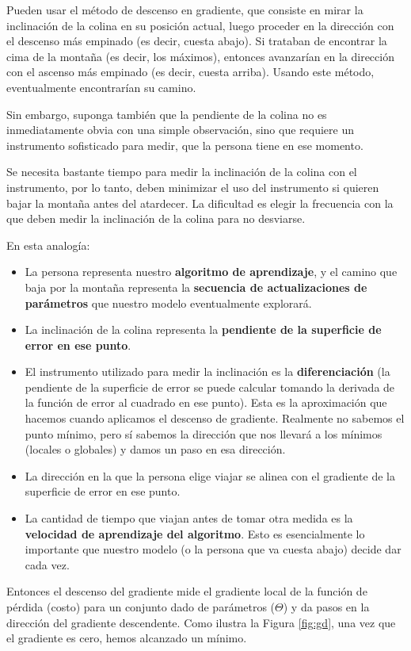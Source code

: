\documentclass[a4paper,12pt]{article}
\begin{document}
Pueden usar el método de descenso en gradiente, que consiste en mirar la inclinación de la colina en su posición actual, luego proceder en la dirección con el descenso más empinado (es decir, cuesta abajo).
Si trataban de encontrar la cima de la montaña (es decir, los máximos), entonces avanzarían en la dirección con el ascenso más empinado (es decir, cuesta arriba). Usando este método, eventualmente encontrarían su camino.

Sin embargo, suponga también que la pendiente de la colina no es inmediatamente obvia con una simple observación, sino que requiere un instrumento sofisticado para medir, que la persona tiene en ese momento.

Se necesita bastante tiempo para medir la inclinación de la colina con el instrumento, por lo tanto, deben minimizar el uso del instrumento si quieren bajar la montaña antes del atardecer.
La dificultad es elegir la frecuencia con la que deben medir la inclinación de la colina para no desviarse.

En esta analogía:
\begin{itemize}[noitemsep, topsep=2pt]
	\item La persona representa nuestro \textbf{algoritmo de aprendizaje}, y el camino que baja por la montaña representa la \textbf{secuencia de actualizaciones de parámetros} que nuestro modelo eventualmente explorará.
	\item La inclinación de la colina representa la \textbf{pendiente de la superficie de error en ese punto}.
	\item El instrumento utilizado para medir la inclinación es la \textbf{diferenciación} (la pendiente de la superficie de error se puede calcular tomando la derivada de la función de error al cuadrado en ese punto). Esta es la aproximación que hacemos cuando aplicamos el descenso de gradiente. Realmente no sabemos el punto mínimo, pero sí sabemos la dirección que nos llevará a los mínimos (locales o globales) y damos un paso en esa dirección.
	\item La dirección en la que la persona elige viajar se alinea con el gradiente de la superficie de error en ese punto.
	\item La cantidad de tiempo que viajan antes de tomar otra medida es la \textbf{velocidad de aprendizaje del algoritmo}. Esto es esencialmente lo importante que nuestro modelo (o la persona que va cuesta abajo) decide dar cada vez.
\end{itemize}

Entonces el descenso del gradiente mide el gradiente local de la función de pérdida (costo) para un conjunto dado de parámetros ($\Theta$) y da pasos en la dirección del gradiente descendente. Como ilustra la Figura \ref{fig:gd}, una vez que el gradiente es cero, hemos alcanzado un mínimo.
\end{document}
